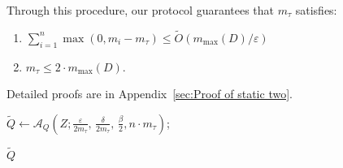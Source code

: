 Through this procedure, our protocol guarantees that $m_\tau$ satisfies:
\begin{enumerate}
\item[(a)] $\sum_{i=1}^n \max(0, m_i - m_\tau) \le \tilde{O}(m_{\max}(D)/\varepsilon)$
\item[(b)] $m_\tau \le 2 \cdot m_{\max}(D)$.
\end{enumerate}
Detailed proofs are in Appendix~\ref{sec:Proof of static two}.




\begin{algorithm}[t]
\caption{Randomizer for Query $Q$} 
\label{alg: randomizer for query evaluation}





\end{algorithm}


\begin{algorithm}[t]
\caption{Analyzer for Query $Q$} 
\label{alg:analyzer for query evaluation}


$\tilde{Q}\gets \mathcal{A}_Q(Z; \frac{\varepsilon}{2m_\tau},\, \frac{\delta}{2m_\tau},\, \frac{\beta}{2},  n\cdot m_\tau)$;

\Return $\tilde{Q}$

\end{algorithm}

